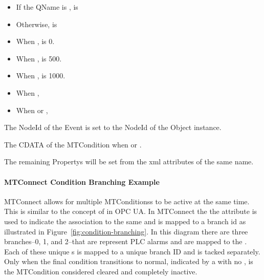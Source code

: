 \begin{description}[font=\it\bfseries,labelindent=4em,labelwidth=6em,leftmargin=!]    
  \item[EnableState]
  \begin{itemize}
    \item If the \gls{QName} is ,  is 
    \item Otherwise,  is 
  \end{itemize}
  \vspace{1em}
  \item[Severity]
  \begin{itemize}
    \item When ,  is 0.
    \item When ,  is 500.
    \item When ,  is 1000.
  \end{itemize}
  \vspace{1em}
  \item[Retain]
  \begin{itemize}
    \item When , 
    \item When  or , 
  \end{itemize}
  \vspace{1em}
  \item[Time] 
  \item[NodeId] The \gls{NodeId} of the \gls{Event} is set to the \gls{NodeId} of the  \gls{Object} instance.
  \item[Message] The \gls{CDATA} of the \gls{MTCondition} when  or .
  \item[\ldots] The remaining \glspl{Property} will be set from the \gls{xml} attributes of the same name.
\end{description}

\paragraph{MTConnect Condition Branching Example}

MTConnect allows for multiple \glspl{MTCondition}s to be active at the same time. This is similar to the concept of  in OPC UA. In MTConnect the the attribute  is used to indicate the association to the same  and is mapped to a branch id as illustrated in Figure~\ref{fig:condition-branching}. In this diagram there are three branches--0, 1, and 2--that are represent PLC alarms and are mapped to the . Each of these unique s is mapped to a unique branch ID and is tacked separately. Only when the final condition transitions to normal, indicated by a  with no , is the \gls{MTCondition} considered cleared and completely inactive.

